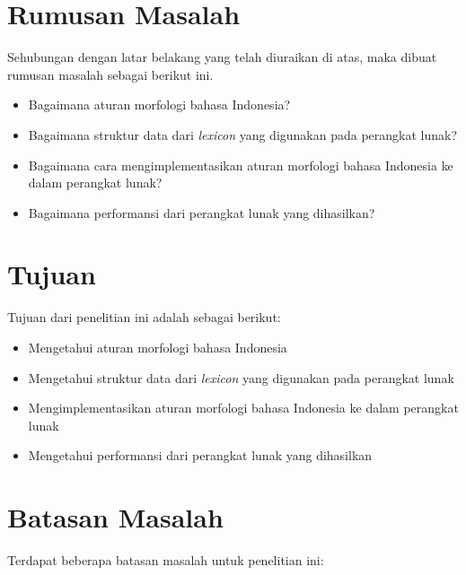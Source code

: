 

\section{Rumusan Masalah}
\label{sec:rumusanMasalah}

Sehubungan dengan latar belakang yang telah diuraikan di atas, maka dibuat rumusan masalah sebagai berikut ini.
\begin{itemize}
	\item Bagaimana aturan morfologi bahasa Indonesia?
	\item Bagaimana struktur data dari {\it lexicon} yang digunakan pada perangkat lunak?
	\item Bagaimana cara mengimplementasikan aturan morfologi bahasa Indonesia ke dalam perangkat lunak?
	\item Bagaimana performansi dari perangkat lunak yang dihasilkan?
\end{itemize}

\section{Tujuan}
\label{sec:tujuan}

Tujuan dari penelitian ini adalah sebagai berikut:
\begin{itemize}
	\item Mengetahui aturan morfologi bahasa Indonesia
	\item Mengetahui struktur data dari {\it lexicon} yang digunakan pada perangkat lunak
	\item Mengimplementasikan aturan morfologi bahasa Indonesia ke dalam perangkat lunak
	\item Mengetahui performansi dari perangkat lunak yang dihasilkan
\end{itemize}

\section{Batasan Masalah}
\label{sec:batasanMasalah}

Terdapat beberapa batasan masalah untuk penelitian ini:


